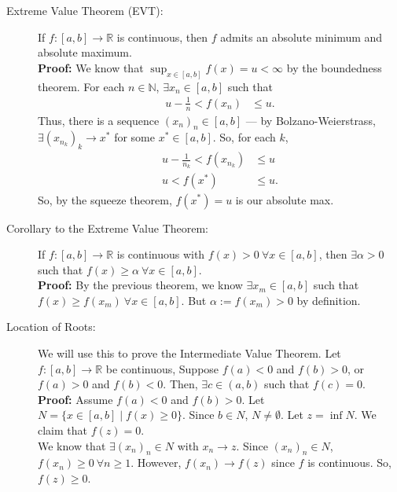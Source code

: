 \documentclass[10pt]{extarticle}
\newcommand{\N}{\mathbb{N}}
\newcommand{\R}{\mathbb{R}}
\begin{document}
    \begin{description}
      \item[Extreme Value Theorem (EVT):] If $f: [a,b] \rightarrow \R$ is continuous, then $f$ admits an absolute minimum and absolute maximum.\\

        \textbf{Proof:} We know that $\sup_{x\in[a,b]}f(x) = u < \infty$ by the boundedness theorem. For each $n\in \N$, $\exists x_n\in [a,b]$ such that
        \begin{align*}
          u-\frac{1}{n} < f(x_n) &\leq u.
        \end{align*}
        Thus, there is a sequence $(x_n)_n \in [a,b]$ --- by Bolzano-Weierstrass, $\exists (x_{n_k})_k \rightarrow x^{\ast}$ for some $x^{\ast}\in [a,b]$. So, for each $k$,
        \begin{align*}
          u-\frac{1}{n_k} < f(x_{n_k}) &\leq u\\
          u < f(x^{\ast}) &\leq u. \tag*{since $f$ is continuous}
        \end{align*}
        So, by the squeeze theorem, $f(x^{\ast}) = u$ is our absolute max.
      \item[Corollary to the Extreme Value Theorem:] If $f: [a,b]\rightarrow \R$ is continuous with $f(x) > 0~\forall x\in [a,b]$, then $\exists \alpha > 0$ such that $f(x) \geq \alpha~\forall x\in [a,b]$.\\

        \textbf{Proof:} By the previous theorem, we know $\exists x_m\in [a,b]$ such that $f(x) \geq f(x_m)~\forall x\in [a,b]$. But $\alpha:= f(x_m) > 0$ by definition.
      \item[Location of Roots:] We will use this to prove the Intermediate Value Theorem. Let $f: [a,b] \rightarrow \R$ be continuous, Suppose $f(a) < 0$ and $f(b) > 0$, or $f(a) > 0$ and $f(b) < 0$. Then, $\exists c\in (a,b)$ such that $f(c) = 0$.\\

        \textbf{Proof:} Assume $f(a) < 0$ and $f(b) > 0$. Let $N = \{x\in [a,b] \mid f(x) \geq 0\}$. Since $b\in N$, $N\neq \emptyset$. Let $z = \inf{N}$. We claim that $f(z) = 0$.\\

        We know that $\exists (x_n)_n \in N$ with $x_n \rightarrow z$. Since $(x_n)_n \in N$, $f(x_n) \geq 0~\forall n\geq 1$. However, $f(x_n) \rightarrow f(z)$ since $f$ is continuous. So, $f(z) \geq 0$.\\


\end{description}
\end{document}

